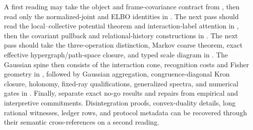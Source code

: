 A first reading may take the object and frame-covariance contract from
, then read only the normalized-joint and
ELBO identities in .  The next pass
should read the local--collective potential theorem and interaction-label
attention in , then the covariant pullback and
relational-history constructions in
.  The next pass should
take the three-operation distinction, Markov coarse theorem, exact effective
hypergraph/path-space closure, and typed scale diagram in
.  The Gaussian spine then consists of the interaction cone,
recognition costs and Fisher geometry in
, followed by Gaussian
aggregation, congruence-diagonal Kron closure, holonomy, fixed-ray
qualifications, generalized spectra, and numerical gates in
.  Finally,
 separate exact no-go results and repairs
from empirical and interpretive commitments.  Disintegration proofs,
convex-duality details, long rational witnesses, ledger rows, and protocol
metadata can be recovered through their semantic cross-references on a second
reading.

